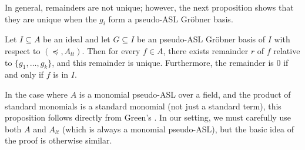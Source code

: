\documentclass[11pt,reqno]{amsart}
\newcommand{\gb}{Gr\"{o}bner }
\theoremstyle{definition}
\numberwithin{equation}{section}
\begin{document}
In general, remainders are not unique; however, the next proposition shows that they are unique when the $g_i$ form a pseudo-ASL Gr\"{o}bner basis.

\begin{proposition}
\label{prop:unique-remainder}
Let $I \subseteq A$ be an ideal and let $G \subseteq I$ be an pseudo-ASL \gb basis of $I$ with respect to $(\preceq, A_{lt})$. Then for every $f \in A$, there exists remainder $r$ of $f$ relative to $\{g_1, \dotsc, g_k\}$, and this remainder is unique. Furthermore, the remainder is 0 if and only if $f$ is in $I$.
\end{proposition}

In the case where $A$ is a monomial pseudo-ASL over a field, and the product of standard monomials is a standard monomial (not just a standard term), this proposition follows directly from Green's \cite[Prop~2.7]{green}. In our setting, we must carefully use both $A$ and $A_{lt}$ (which is always a monomial pseudo-ASL), but the basic idea of the proof is otherwise similar.
\end{document}
